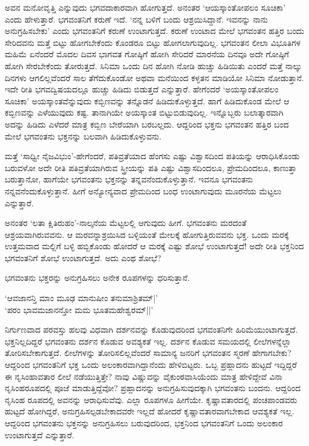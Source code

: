 ಅವನ ಮನೋವೃತ್ತಿ ಎನ್ನುವುದು ಭಗವದಾಕಾರವಾಗಿ ಹೋಗುತ್ತದೆ. ಅನಂತರ `ಆಯಸ್ಕಾಂತೋಪಲಂ ಸೂಚಿಕಾ' ಎಂದು ಹೇಳುತ್ತಾರೆ. ಭಗವಂತನಿಗೆ ಕರುಣೆ ಇದೆ. `ನನ್ನ ಬಳಿಗೆ ಬಂದು ಆಶ್ರಯಿಸಿದ್ದಾನೆ. ಇವನನ್ನು ನಾನು ಅನುಗ್ರಹಿಸಬೇಕು' ಎಂದು ಭಗವಂತನಿಗೆ ಕರುಣೆ ಉಂಟಾಗುತ್ತದೆ. ಕರುಣೆ ಉಂಟಾದ ಮೇಲೆ ಭಗವಂತನ ಹತ್ತಿರ ಬಂದು ಸೇರಿದವನು ಮತ್ತೆ ಬಿಟ್ಟು ಹೋಗಬೇಕೆಂದು ಕೊಂಡರೂ ಬಿಟ್ಟು ಹೋಗಲಾಗುವುದಿಲ್ಲ. ಭಗವಂತನ ಲೀಲಾ ವಿಭೂತಿಗಳ ಮಹಿಮೆ ಏನೆಂದರೆ ಮೊದಲ ದಿವಸ ಭಾಗವತ ಗೋಷ್ಠಿಗೆ ಹೋಗಿ ಸೇರಿದರೆ ಮಾರನೆಯ ದಿನವೂ ಅದೇ ಗೋಷ್ಠಿಗೆ ಹೋಗಿ ಸೇರಬೇಕೆಂದು ತೋರುತ್ತದೆ. ಸಿನಿಮಾ ಒಂದು ದಿನ ಹೋಗಿ ನೋಡಿ ಹುಚ್ಚು ಹಿಡಿಯಿತು ಎಂದರೆ ಮತ್ತೆ ನಾಲ್ಕು ದಿನಗಳು ಆಗಲಿಲ್ಲವೆಂದರೆ ಸಾಲ ತೆಗೆದುಕೊಂಡೋ ಅಥವಾ ಮನೆಯಿಂದ ಕಳ್ಳತನ ಮಾಡಿಯೋ ಸಿನಿಮಾ ನೋಡುತ್ತಾನೆ. ಇದೇ ರೀತಿ ಭಗವದ್ವಿಷಯದಲ್ಲೂ ಹುಚ್ಚು ಹಿಡಿದು ಬಿಡುತ್ತದೆ ಎನ್ನುತ್ತಾರೆ. ಹೇಗೆಂದರೆ `ಅಯಸ್ಕಾಂತೋಪಲಂ ಸೂಚಿಕಾ' ಅಯಸ್ಕಾಂತವೆನ್ನುವುದು ಕಬ್ಬಿಣವನ್ನು ತನ್ನೊಡನೆ ಹಿಡಿದುಕೊಳ್ಳುತ್ತದೆ. ಹಾಗೆ ಹಿಡಿದುಕೊಂಡ ಮೇಲೆ ಆ ಕಬ್ಬಿಣವನ್ನು ಎಳೆಯುವುದು ಕಷ್ಟ. ತಾನಾಗಿಯೇ ಅಯಸ್ಕಾಂತ ಬಿಟ್ಟುಬಿಡುವುದಿಲ್ಲ. ಇನ್ನೊಬ್ಬರು ಬಲಾತ್ಕಾರವಾಗಿ ಅದನ್ನು ಹಿಡಿದು ಎಳೆದರೆ ಮಾತ್ರ ಕಬ್ಬಿಣ ಬೇರೆಯಾಗಿ ಬರಬಲ್ಲದು. ಆದ್ದರಿಂದ ಭಕ್ತನು ಭಗವಂತನ ಹತ್ತಿರ ಬಂದ ಮೇಲೆ ಭಗವಂತನು ಭಕ್ತನನ್ನು ಬಲವಾಗಿ ಹಿಡಿದುಕೊಳ್ಳುವನು. 

ಮತ್ತೆ `ಸಾಧ್ವೀ ನೈಜವಿಭುಂ'-ಹೇಗೆಂದರೆ, ಪತಿವ್ರತೆಯಾದ ಹೆಂಗಸು ಎಷ್ಟು ವಿಶ್ವಾಸದಿಂದ ಪತಿಯನ್ನು ಆರಾಧಿಸಿಕೊಂಡು ಬರುವಳೋ ಅದೇ ರೀತಿ ಪತಿವ್ರತೆಯಾಗಿರುವ ಸ್ತ್ರೀಯನ್ನು ಪತಿ ಎಷ್ಟು ವಿಶ್ವಾಸದಿಂದಲೂ, ಪ್ರೇಮದಿಂದಲೂ, ಕಾಣುತ್ತಾ ಬರುತ್ತಾನೋ, ಹಾಗೆಯೇ ಭಗವಂತನು ಭಕ್ತನನ್ನು ತನ್ನವನೆಂದುಕೊಳ್ಳುತ್ತಾನೆ. ಇವನೂ ಭಗವಂತನು ನನ್ನವನೆಂದುಕೊಳ್ಳುತ್ತಾನೆ. ಹೀಗೆ ಅನ್ಯೋನ್ಯವಾದ ಪ್ರೇಮದಿಂದ ಬಂಧ ಉಂಟಾಗುವುದು ಮೂರನೆಯ ಮೆಟ್ಟಲು ಎನ್ನುತ್ತಾರೆ.

ಅನಂತರ `ಲತಾ ಕ್ಷಿತಿರುಹಂ'-ನಾಲ್ಕನೆಯ ಮೆಟ್ಟಲಲ್ಲಿ ಆಗುವುದು ಹೀಗೆ. ಭಗವಂತನು ಮರದಂತೆ ಆಶ್ರಯವಾಗಿರುವವನು. ಆ ಮರವನ್ನಾಶ್ರಯಿಸಿದ ಬಳ್ಳಿಯಂತೆ ಮೇಲಕ್ಕೆ ಹೋಗುತ್ತಿರುವವನು ಭಕ್ತ. ಒಂದು ಮರಕ್ಕೆ ಉತ್ತಮವಾದ ಮಲ್ಲಿಗೆ ಬಳ್ಳಿ ಹಬ್ಬಿಕೊಂಡು ಹೋದರೆ ಆ ಮರಕ್ಕೆ ಎಷ್ಟು ಶೋಭೆ ಉಂಟಾಗುತ್ತದೆ! ಅದೇ ರೀತಿ ಭಕ್ತನಿಂದ ಭಗವಂತನಿಗೆ ಶೋಭೆ ಉಂಟಾಗುತ್ತದೆ. ಅದು ಎಂಥ ಶೋಭೆ?

ಭಗವಂತನು ಭಕ್ತರನ್ನು ಅನುಗ್ರಹಿಸಲು ಅನೇಕ ರೂಪಗಳನ್ನು ಧರಿಸುತ್ತಾನೆ. 

\begin{shloka}
`ಆವಜಾನನ್ತಿ ಮಾಂ ಮೂಢ ಮಾನುಷೀಂ ತನುಮಾಶ್ರಿತಮ್|'\\
`ಪರಂ ಭಾವಮಜಾನನ್ತೋ ಮಮ ಭೂತಮಹೇಶ್ವರಮ್||'
\end{shloka}

ನಿರ್ಗುಣವಾದ ಪರವಸ್ತು ಹಲವು ವಿಧವಾಗಿ ದರ್ಶನವನ್ನು ಕೊಡುವುದರಿಂದ ಭಗವಂತನಿಗೇ ಹಿರಿಮೆಯುಂಟಾಗುತ್ತದೆ. ಭಕ್ತನಿಲ್ಲದಿದ್ದರೆ ಭಗವಂತನು ದರ್ಶನ ಕೊಡುವ ಅವಶ್ಯಕತೆ ಇಲ್ಲ. ದರ್ಶನ ಕೊಡುವ ಸಮಯದಲ್ಲಿ ಲೀಲೆಗಳನ್ನೆಲ್ಲಾ ತೋರಿಸಬೇಕಾಗುತ್ತದೆ. ಲೀಲೆಗಳನ್ನು ತೋರಿಸಲಿಲ್ಲವೆಂದರೆ ಸಾಮಾನ್ಯ ಜನರಿಗೆ ಭಗವಂತನ ಸ್ಮರಣೆ ಹೇಗಾಗಬೇಕು? ಆದ್ದರಿಂದ ಭಗವಂತನಿಗೆ ಭಕ್ತ ಒಂದು ಅಲಂಕಾರವಾಗಿದ್ದಾನೆಂದು ಹೇಳಿಬಿಟ್ಟರು. ಒಬ್ಬ ಪ್ರಹ್ಲಾದನು ಹುಟ್ಟದೆ ಇದ್ದಿದ್ದರೆ ಈ ನೃಸಿಂಹಾವತಾರ ಲೀಲೆ ನಡೆಯುತ್ತಿತ್ತೇ? ನಾವು ವಿಷ್ಣುವನ್ನು ವೈಕುಂಠವಾಸಿಯೆಂದು ಮಾತ್ರ ಹೇಳಿದ್ದೇವೆ ವಿನಾ ನೃಸಿಂಹರೂಪದಲ್ಲಿ ಪೂಜೆ ಮಾಡುತ್ತಿದ್ದೆವೋ? ಪ್ರಹ್ಲಾದನನ್ನು ಅನುಗ್ರಹಿಸುವುದಕ್ಕಾಗಿ ಭಗವಂತನು ಬಂದನು. ಆದ್ದರಿಂದ ನೃಸಿಂಹ ರೂಪದಲ್ಲಿ ಅವನನ್ನು ಆರಾಧಿಸುವೆವು. ಎಲ್ಲಾ ರೂಪಗಳೂ ಹೀಗೆಯೇ. ಕೃಷ್ಣಾವತಾರದಲ್ಲಿ ಪಂಚಪಾಂಡವರು ಹುಟ್ಟದೆ ಹೋಗಿದ್ದರೆ, ಅನುಗ್ರಹಿಸಲ್ಪಡಬೇಕಾದವರೇ ಇಲ್ಲದೆ ಹೋದರೆ ಕೃಷ್ಣಾವತಾರವಾಗಬೇಕಾದ ಆವಶ್ಯಕತೆ ಇಲ್ಲ. ಆದ್ದರಿಂದ ಭಗವಂತನು ಭಕ್ತನನ್ನು ಅನುಗ್ರಹಿಸಲು ಬರುವುದರಿಂದ, ಭಕ್ತನಿಂದ ಭಗವಂತನಿಗೆ ಒಂದು ಅಲಂಕಾರ ಉಂಟಾಗುತ್ತದೆ ಎನ್ನುತ್ತಾರೆ.

